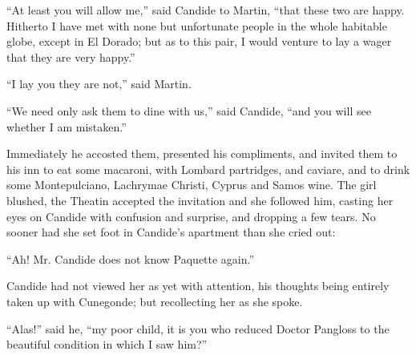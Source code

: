 ``At least you will allow me,'' said Candide to Martin, ``that these two are happy. Hitherto I have met with none but unfortunate people in the whole habitable globe, except in El Dorado; but as to this pair, I would venture to lay a wager that they are very happy.''

``I lay you they are not,'' said Martin.

``We need only ask them to dine with us,'' said Candide, ``and you will see whether I am mistaken.''

Immediately he accosted them, presented his compliments, and invited them to his inn to eat some macaroni, with Lombard partridges, and caviare, and to drink some Montepulciano, Lachrymae Christi, Cyprus and Samos wine. The girl blushed, the Theatin accepted the invitation and she followed him, casting her eyes on Candide with confusion and surprise, and dropping a few tears. No sooner had she set foot in Candide's apartment than she cried out:

``Ah! Mr. Candide does not know Paquette again.''

Candide had not viewed her as yet with attention, his thoughts being entirely taken up with Cunegonde; but recollecting her as she spoke.

``Alas!'' said he, ``my poor child, it is you who reduced Doctor Pangloss to the beautiful condition in which I saw him?''


